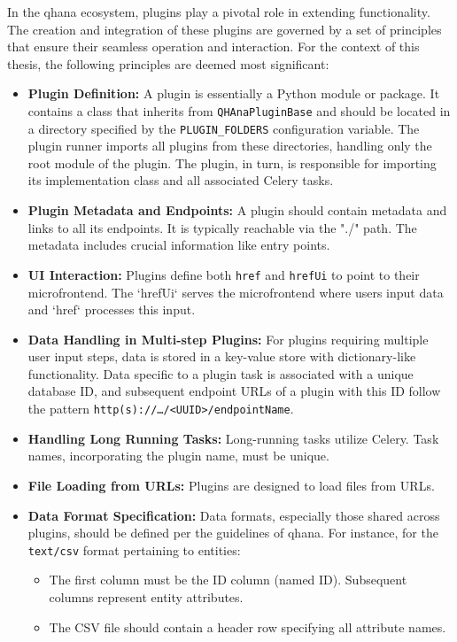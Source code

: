 \documentclass[
  a4paper,  %
  twoside,  %
  bibliography=totoc,
  headsepline,
  cleardoublepage=empty,
  parskip=half,
  draft=false
]{scrbook}
\begin{document}
In the \gls{qhana} ecosystem, plugins play a pivotal role in extending functionality.
The creation and integration of these plugins are governed by a set of principles that ensure their seamless operation and interaction.
For the context of this thesis, the following principles are deemed most significant:

\begin{itemize}
    \item \textbf{Plugin Definition:}
    A plugin is essentially a Python module or package.
    It contains a class that inherits from \texttt{QHAnaPluginBase} and should be located in a directory specified by the \texttt{PLUGIN\_FOLDERS} configuration variable.
    The plugin runner imports all plugins from these directories, handling only the root module of the plugin.
    The plugin, in turn, is responsible for importing its implementation class and all associated Celery tasks.

    \item \textbf{Plugin Metadata and Endpoints:}
    A plugin should contain metadata and links to all its endpoints. It is typically reachable via the "./" path.
    The metadata includes crucial information like entry points.

    \item \textbf{UI Interaction:}
    Plugins define both \texttt{href} and \texttt{hrefUi} to point to their microfrontend.
    The `hrefUi` serves the microfrontend where users input data and `href` processes this input.

    \item \textbf{Data Handling in Multi-step Plugins:}
    For plugins requiring multiple user input steps, data is stored in a key-value store with dictionary-like functionality.
    Data specific to a plugin task is associated with a unique database ID, and subsequent endpoint URLs of a plugin with this ID follow the pattern \texttt{http(s)://…/<UUID>/endpointName}.

    \item \textbf{Handling Long Running Tasks:}
    Long-running tasks utilize Celery. Task names, incorporating the plugin name, must be unique.

    \item \textbf{File Loading from URLs:}
    Plugins are designed to load files from URLs.

    \item \textbf{Data Format Specification:}
    Data formats, especially those shared across plugins, should be defined per the guidelines of \gls{qhana}.
    For instance, for the \texttt{text/csv} format pertaining to entities:
    \begin{itemize}
        \item The first column must be the ID column (named ID). Subsequent columns represent entity attributes.
        \item The CSV file should contain a header row specifying all attribute names.
    \end{itemize}
\end{itemize}
\end{document}
